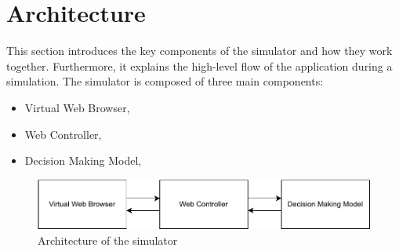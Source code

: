 
\section{Architecture}

This section introduces the key components of the simulator and how they work together. Furthermore, it explains the high-level flow of the application during a simulation. The simulator is composed of three main components:

\begin{itemize}
    \item Virtual Web Browser,
    \item Web Controller,
    \item Decision Making Model,
\end{itemize}


\begin{figure}[H]
\label{arch}
    \centering
    \includegraphics[width=1\textwidth]{obrazky-figures/architecture_small.pdf}
    \caption{Architecture of the simulator}
\end{figure}

